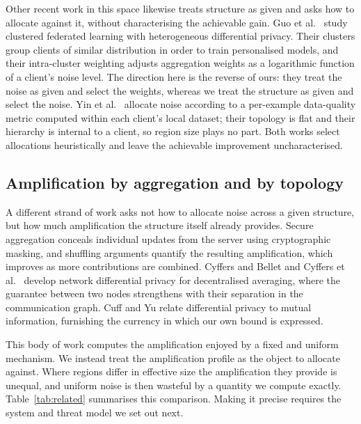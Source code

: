 \documentclass[acmsmall,screen,review,anonymous]{acmart}
\theoremstyle{acmdefinition}%
\begin{document}
Other recent work in this space likewise treats structure as given and asks how to
allocate against it, without characterising the achievable gain. Guo et
al.~\cite{guo2025fedcdp} study clustered federated learning with heterogeneous
differential privacy. Their clusters group clients of similar distribution in order
to train personalised models, and their intra-cluster weighting adjusts aggregation
weights as a logarithmic function of a client's noise level. The direction here is
the reverse of ours: they treat the noise as given and select the weights, whereas
we treat the structure as given and select the noise. Yin et
al.~\cite{yin2026hdpfedcd} allocate noise according to a per-example data-quality
metric computed within each client's local dataset; their topology is flat and
their hierarchy is internal to a client, so region size plays no part. Both works
select allocations heuristically and leave the achievable improvement
uncharacterised.

\subsection{Amplification by aggregation and by topology}

A different strand of work asks not how to allocate noise across a given
structure, but how much amplification the structure itself already provides.
Secure aggregation \cite{bonawitz2017secagg} conceals individual updates from the
server using cryptographic masking, and shuffling arguments quantify the resulting
amplification, which improves as more contributions are combined. Cyffers and
Bellet \cite{cyffers2022amplification} and Cyffers et
al.~\cite{cyffers2022muffliato} develop network differential privacy for
decentralised averaging, where the guarantee between two nodes strengthens with
their separation in the communication graph. Cuff and Yu \cite{cuff2016mi} relate
differential privacy to mutual information, furnishing the currency in which our
own bound is expressed.

This body of work computes the amplification enjoyed by a fixed and uniform
mechanism. We instead treat the amplification profile as the object to allocate
against. Where regions differ in effective size the amplification they provide is
unequal, and uniform noise is then wasteful by a quantity we compute exactly.
Table~\ref{tab:related} summarises this comparison. Making it precise requires the
system and threat model we set out next.
\end{document}
